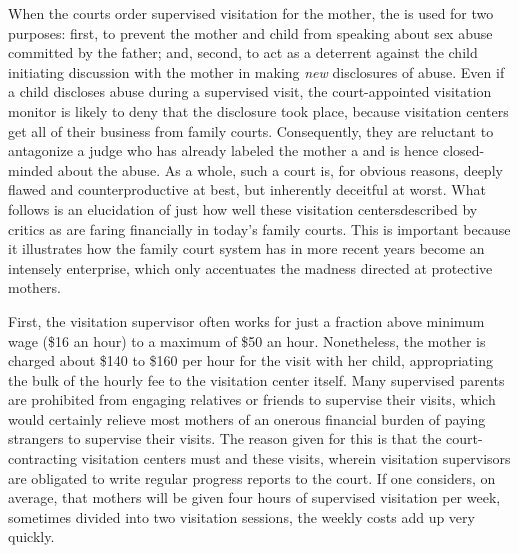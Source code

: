 \vspace{2em}



\noindent{}When the courts order supervised visitation for the mother, the  is used for two purposes: first, to prevent the mother and
child from speaking about sex abuse committed by the father; and, second, to act as a deterrent against the child initiating discussion with the
mother in making \textit{new} disclosures of abuse. 
Even if a child discloses abuse 
during a supervised visit, the court-appointed visitation monitor is likely
to deny that the disclosure took place, because visitation centers get all
of their business from family courts.
Consequently, they are reluctant to
antagonize a judge who has already labeled the mother a 
 and is hence closed-minded about the abuse. 
As a whole, such a
court  is, for obvious reasons, deeply flawed and counterproductive at best, but inherently deceitful at worst.  What follows is an elucidation
of just how well these visitation centers\mdash{}described by
critics as \mdash{}are faring financially in today's
family courts.  This is important because 
it illustrates how the family court system has 
in more recent years become an intensely  enterprise, which only accentuates the madness directed at protective mothers. \pfl{}

\vspace{2.5em}


\noindent{}First, the visitation supervisor often works for just a fraction above
minimum wage (\$16 an hour) to a maximum of \$50 an hour.
Nonetheless, the mother is charged about \$140 to \$160 per hour for the
visit with her child, appropriating the bulk of the hourly fee to 
the visitation center itself. Many supervised 
parents are prohibited from engaging relatives
or friends to supervise their visits, which would certainly relieve most
mothers of an onerous financial burden of paying strangers to supervise 
their visits. The reason given for this is that
the court-contracting
visitation centers must  and  these visits, wherein visitation
supervisors are obligated to write regular progress reports to the court.
If one considers, on average, that mothers will be given four hours of
supervised visitation per week, sometimes divided into two visitation
sessions, the weekly costs add up very quickly. \pfl{}

